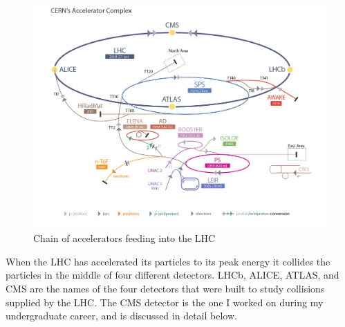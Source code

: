 \begin{figure}
\centering
\includegraphics[width=0.8\linewidth]{Figures/acceleratorcomplex.jpg}
\caption{Chain of accelerators feeding into the LHC}
\label{fig:acceleratorcomplex}
\end{figure}

When the LHC has accelerated its particles to its peak energy it collides the particles in the middle of four different detectors. LHCb, ALICE, ATLAS, and CMS are the names of the four detectors that were built to study collisions supplied by the LHC. The CMS detector is the one I worked on during my undergraduate career, and is discussed in detail below.

